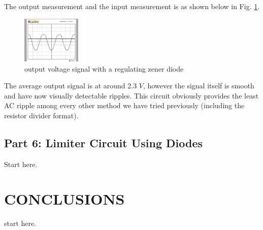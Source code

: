 \documentclass[letterpaper, 10 pt, conference]{ieeeconf}  %
\begin{document}
\par The output measurement and the input measurement is as shown below in Fig. \ref{fig:5.4}.
\begin{figure}[h]
  \centering
  \includegraphics[width=0.25\textwidth]{images/5_4.png}
  \caption{output voltage signal with a regulating zener diode}
  \label{fig:5.4}
\end{figure}
\par The average output signal is at around 2.3 $V$, however the signal itself
is smooth and have now visually detectable ripples. This circuit obviously
provides the least AC ripple among every other method we have tried previously
(including the resistor divider format).
\subsection{Part 6: Limiter Circuit Using Diodes}
Start here.

\section{CONCLUSIONS}
start here.








\end{document}
